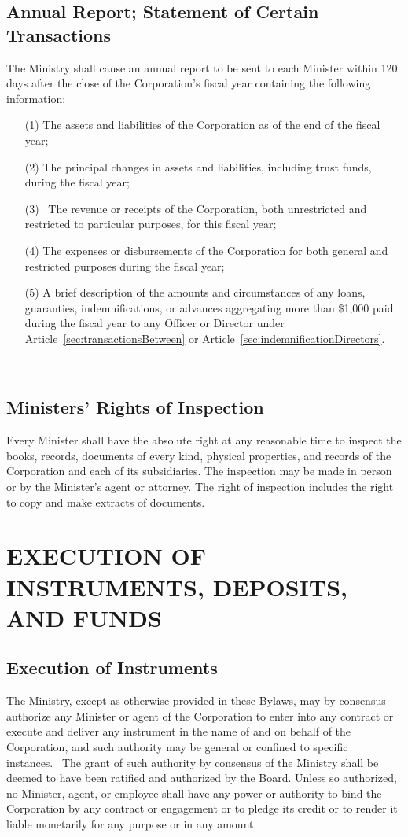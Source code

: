 \documentclass[letterpaper,titlepage]{article}
\begin{document}
\subsection{Annual Report; Statement of Certain Transactions}
\label{sec:annualReport}
The Ministry shall cause an annual report to be sent to each Minister within
120 days after the close of the Corporation’s fiscal year containing the
following information: 
\begin{itemize}
    \item[(1)] The assets and liabilities of the Corporation as of the end of
        the fiscal year;
    \item[(2)] The principal changes in assets and liabilities, including trust
        funds, during the fiscal year;
    \item[(3)] The revenue or receipts of the Corporation, both unrestricted
        and restricted to particular purposes, for this fiscal year;
    \item[(4)] The expenses or disbursements of the Corporation for both
        general and restricted purposes during the fiscal year;
    \item[(5)] A brief description of the amounts and circumstances of any
        loans, guaranties, indemnifications, or advances aggregating more than
        \$1,000 paid during the fiscal year to any Officer or Director under
        Article~\ref{sec:transactionsBetween} or
        Article~\ref{sec:indemnificationDirectors}.
\end{itemize} 
\subsection{Ministers' Rights of Inspection}
\label{sec:minstersRights}
Every Minister shall have the absolute right at any reasonable time to inspect
the books, records, documents of every kind, physical properties, and records
of the Corporation and each of its subsidiaries. The inspection may be made in
person or by the Minister’s agent or attorney. The right of inspection includes
the right to copy and make extracts of documents.
\section{EXECUTION OF INSTRUMENTS, DEPOSITS, AND FUNDS}
\label{sec:instrumentsDepositsFunds}
\subsection{Execution of Instruments}
\label{sec:executionInstruments}
The Ministry, except as otherwise provided in these Bylaws, may by consensus
authorize any Minister or agent of the Corporation to enter into any contract
or execute and deliver any instrument in the name of and on behalf of the
Corporation, and such authority may be general or confined to specific
instances.  The grant of such authority by consensus of the Ministry shall be
deemed to have been ratified and authorized by the Board.  Unless so
authorized, no Minister, agent, or employee shall have any power or authority
to bind the Corporation by any contract or engagement or to pledge its credit
or to render it liable monetarily for any purpose or in any amount.
\end{document}
